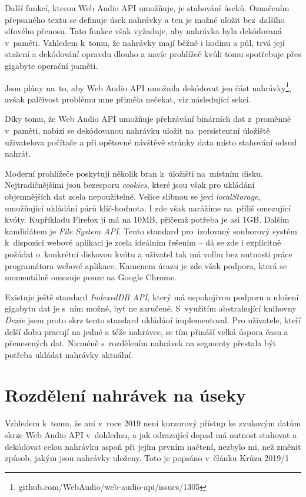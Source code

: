 Další funkcí, kterou Web Audio API umožňuje, je stahování úseků. Označením
přepsaného textu se definuje úsek nahrávky a ten je možné uložit bez~dalšího
síťového přenosu. Tato funkce však vyžaduje, aby nahrávka byla dekódovaná
v~paměti. Vzhledem k~tomu, že nahrávky mají běžně i hodinu a půl, trvá její
stažení a dekódování opravdu dlouho a navíc prohlížeč kvůli tomu spotřebuje přes
gigabyte operační paměti.

Jsou plány na~to, aby Web Audio API umožnila dekódovat jen část
nahrávky\footnote{github.com/WebAudio/web-audio-api/issues/1305}, avšak
palčivost problému mne přiměla nečekat, viz následující sekci.

Díky tomu, že Web Audio API umožňuje přehrávání binárních dat z~proměnné
v~paměti, nabízí se dekódovanou nahrávku uložit na~persistentní úložiště
uživatelova počítače a při opětovné návštěvě stránky data místo stahování odsud
nahrát.

Moderní prohlížeče poskytují několik bran k~úložišti na~místním disku.
Nejtradičnějšími jsou bezesporu \textit{cookies}, které jsou však pro ukládání
objemnějších dat zcela nepoužitelné. Velice slibnou se jeví
\textit{localStorage}, umožňující ukládání párů klíč-hodnota. I zde však
narážíme na~příliš omezující kvóty. Kupříkladu Firefox ji má na 10MB, přičemž
potřeba je asi 1GB. Dalším kandidátem je \textit{File System API}. Tento
standard pro~izolovaný souborový systém k~dispozici webové aplikaci je zcela
ideálním řešením -- dá se zde i explicitně požádat o~konkrétní diskovou kvótu a
uživatel tak má volbu bez nutnosti práce programátora webové aplikace. Kamenem
úrazu je zde však podpora, která se momentálně omezuje pouze na Google Chrome.

Existuje ještě standard \textit{IndexedDB API}, který má uspokojivou
podporu a uložení gigabytu dat je s~ním možné, byť ne zaručené. S~využitím
abstrahující knihovny \textit{Dexie} jsem proto skrz tento standard ukládání
implementoval. Pro uživatele, kteří delší dobu pracují na jedné a téže nahrávce,
se tím přináší velká úspora času a přenesených dat. Nicméně s~rozdělením
nahrávek na segmenty přestala být potřeba ukládat nahrávky aktuální.

\section{Rozdělení nahrávek na úseky}
\label{sec:segmenty}

Vzhledem k~tomu, že ani v~roce 2019 není kurzorový přístup ke zvukovým datům
skrze Web Audio API v~dohlednu, a jak odrazující dopad má nutnost
stahovat a dekódovat celou nahrávku aspoň při jejím prvním načtení, nezbylo mi,
než změnit způsob, jakým jsou nahrávky uloženy. Toto je popsáno v~článku Krůza 2019/1\cite{kruza2019restructuring}

